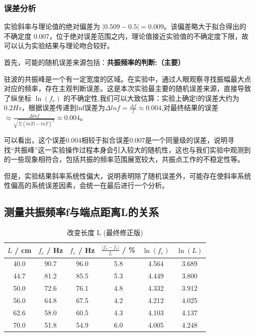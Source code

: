 \documentclass[10pt,twocolumn]{article}
\begin{document}
\subsubsection{误差分析}
实验斜率与理论值的绝对偏差为 $|0.509 - 0.5| = 0.009$。该偏差略大于拟合得出的不确定度 $0.007$，位于绝对误差范围之内，理论值接近实验值的不确定度下限，故可以认为实验结果与理论吻合较好。

\par
首先，可能的随机误差来源包括：\textbf{共振频率的判断:（主要）} 
\par
驻波的共振峰是一个有一定宽度的区域。在实验中，通过人眼观察寻找振幅最大点对应的频率，存在主观判断误差。这是本次实验最主要的随机误差来源，直接导致了纵坐标 $\ln(f_e)$ 的不确定性,我们可以大致估算：实验上确定f的误差大约为$0.2Hz$，根据误差传递到lnf误差为$\Delta lnf = \frac{\Delta f}{f} \approx 0.004$,对最终结果的误差$\approx \frac{\Delta lnf}{\sqrt{\Sigma (lnTi-\bar{lnT})^2}} \approx 0.004$。
\par
可以看出，这个误差$0.004$相较于拟合误差$0.007$是一个同量级的误差，说明寻找“共振峰”这一实验操作过程本身会引入较大的随机性，这也与我们实验中观测到的一些现象相符合，包括共振的频率范围展宽较大，共振点工作的不稳定性等。
\par
但是，实验结果斜率系统性偏大，说明表明除了随机误差外，可能存在使斜率系统性偏高的系统误差因素，会统一在最后进行一个分析。


\subsection{测量共振频率f与端点距离L的关系}
\begin{table}[h]
\centering
\caption{改变长度 L (最终修正版)}
\begin{tabular}{cccccc}
\hline
$L$ / cm & $f_c$ / Hz & $f_e$ / Hz & $\frac{|f_e - f_c|}{f_c}$ / \% & $\ln(f_e)$ & $\ln(L)$ \\
\hline
40.0 & 90.7 & 96.0 & 5.8 & 4.564 & 3.689 \\
44.7 & 81.2 & 85.5 & 5.3 & 4.449 & 3.800 \\
50.0 & 72.6 & 76.1 & 4.8 & 4.332 & 3.912 \\
56.0 & 64.8 & 67.5 & 4.2 & 4.212 & 4.025 \\
62.6 & 58.0 & 60.5 & 4.3 & 4.103 & 4.137 \\
70.0 & 51.8 & 54.9 & 6.0 & 4.005 & 4.248 \\
\hline
\end{tabular}
\end{table}
\end{document}
